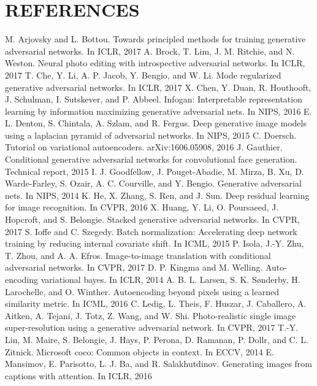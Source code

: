 \documentclass[a4paper,12pt,oneside]{article}
\begin{document}
\section{REFERENCES}
\begin{thebibliography}{9}
 M. Arjovsky and L. Bottou. Towards principled methods for
training generative adversarial networks. In ICLR, 2017
 A. Brock, T. Lim, J. M. Ritchie, and N. Weston. Neural photo editing with introspective adversarial networks. In ICLR,
2017
 T. Che, Y. Li, A. P. Jacob, Y. Bengio, and W. Li. Mode
regularized generative adversarial networks. In ICLR, 2017 
 X. Chen, Y. Duan, R. Houthooft, J. Schulman, I. Sutskever,
and P. Abbeel. Infogan: Interpretable representation learning
by information maximizing generative adversarial nets. In
NIPS, 2016
 E. L. Denton, S. Chintala, A. Szlam, and R. Fergus. Deep
generative image models using a laplacian pyramid of adversarial
networks. In NIPS, 2015
 C. Doersch. Tutorial on variational autoencoders.
arXiv:1606.05908, 2016
 J. Gauthier. Conditional generative adversarial networks for convolutional face generation. Technical report, 2015
 I. J. Goodfellow, J. Pouget-Abadie, M. Mirza, B. Xu,
D. Warde-Farley, S. Ozair, A. C. Courville, and Y. Bengio.
Generative adversarial nets. In NIPS, 2014
 K. He, X. Zhang, S. Ren, and J. Sun. Deep residual learning
for image recognition. In CVPR, 2016
 X. Huang, Y. Li, O. Poursaeed, J. Hopcroft, and S. Belongie.
Stacked generative adversarial networks. In CVPR, 2017
 S. Ioffe and C. Szegedy. Batch normalization: Accelerating
deep network training by reducing internal covariate shift. In
ICML, 2015
 P. Isola, J.-Y. Zhu, T. Zhou, and A. A. Efros. Image-to-image translation with conditional adversarial networks. In CVPR,
2017
 D. P. Kingma and M. Welling. Auto-encoding variational
bayes. In ICLR, 2014
 A. B. L. Larsen, S. K. Sønderby, H. Larochelle, and
O. Winther. Autoencoding beyond pixels using a learned
similarity metric. In ICML, 2016
 C. Ledig, L. Theis, F. Huszar, J. Caballero, A. Aitken, A. Tejani, J. Totz, Z. Wang, and W. Shi. Photo-realistic single image
super-resolution using a generative adversarial network.
In CVPR, 2017
 T.-Y. Lin, M. Maire, S. Belongie, J. Hays, P. Perona, D. Ramanan, P. Dollr, and C. L. Zitnick. Microsoft coco: Common
objects in context. In ECCV, 2014
 E. Mansimov, E. Parisotto, L. J. Ba, and R. Salakhutdinov.
Generating images from captions with attention. In ICLR,
2016
\end{thebibliography}
\end{document}
